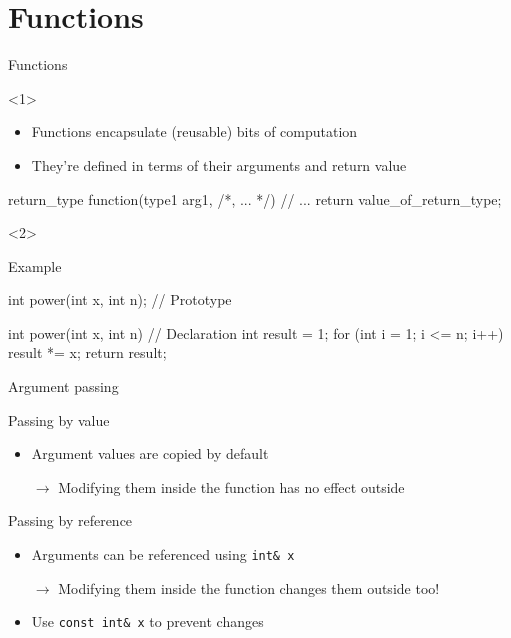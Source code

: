 \section{Functions}

\begin{frame}[fragile]{Functions}
    \begin{onlyenv}<1>
        \begin{itemize}
            \item Functions encapsulate (reusable) bits of computation
            \item They're defined in terms of their arguments and return value
        \end{itemize}
        \begin{cpp}
            return_type function(type1 arg1, /*, ... */)
            {
                // ...
                return value_of_return_type;
            }
        \end{cpp}
    \end{onlyenv}
    \begin{onlyenv}<2>
        \begin{block}{Example}
            \begin{cpp}
                int power(int x, int n); // Prototype

                int power(int x, int n)  // Declaration
                {
                    int result = 1;
                    for (int i = 1; i <= n; i++)
                    {
                        result *= x;
                    }
                    return result;
                }
            \end{cpp}
        \end{block}
    \end{onlyenv}
\end{frame}

\begin{frame}[fragile]{Argument passing}
    \begin{block}{Passing by value}
        \begin{itemize}
            \item Argument values are \alert{copied} by default
            \item[$\rightarrow$] Modifying them inside the function has no
                                 effect outside
        \end{itemize}
    \end{block}
    \begin{block}{Passing by reference}
        \begin{itemize}
            \item Arguments can be referenced using \texttt{int& x}
            \item[$\rightarrow$] Modifying them inside the function changes them
                                 outside too!
            \item Use \texttt{const int& x} to prevent changes
        \end{itemize}
    \end{block}
\end{frame}

